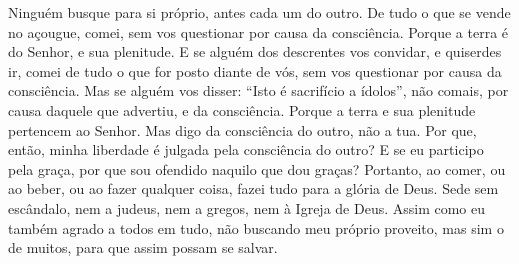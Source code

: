 {  Ninguém busque para si próprio, antes cada um
{} do outro.
  De tudo o que se vende no açougue, comei, sem vos questionar por causa da consciência.
  Porque a terra é do Senhor, e
{} sua plenitude.
  E se alguém dos descrentes vos convidar, e quiserdes ir, comei de tudo o que for posto diante de vós, sem vos questionar por causa da consciência.
  Mas se alguém vos disser: “Isto é sacrifício a ídolos”, não comais, por causa daquele que
{} advertiu, e
{} da consciência. Porque a terra e sua plenitude pertencem ao Senhor.
  Mas digo da consciência do outro, não a tua. Por que, então, minha liberdade é julgada pela consciência do outro?
  E se eu participo
{} pela graça, por que sou ofendido naquilo que dou graças?
  Portanto, ao comer, ou ao beber, ou ao fazer qualquer coisa, fazei tudo para a glória de Deus.
  Sede sem escândalo, nem a judeus, nem a gregos, nem à Igreja de Deus.
  Assim como eu também agrado a todos em tudo, não buscando meu próprio proveito, mas sim o de muitos, para que assim possam se salvar.
\par }

